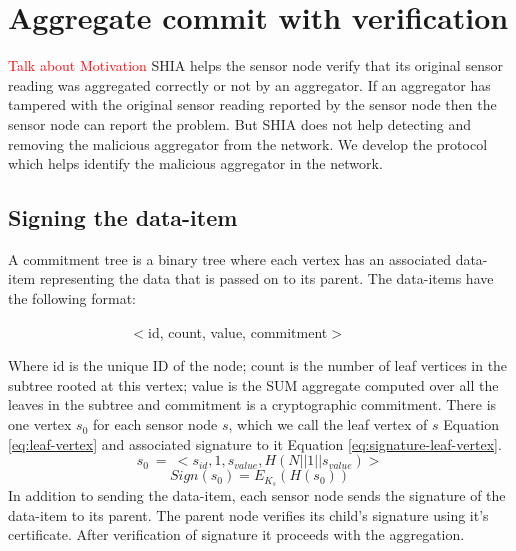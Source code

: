 \chapter{Aggregate commit with verification} %
\label{cha:A Protocol for Commitment Tree Generation}
	
	\textcolor{red}{Talk about Motivation}
	SHIA helps the sensor node verify that its original sensor reading was aggregated correctly or not by an aggregator.
	If an aggregator has tampered with the original sensor reading reported by the sensor node then the sensor node can report the problem.
	But SHIA does not help detecting and removing the malicious aggregator from the network.
	We develop the protocol which helps identify the malicious aggregator in the network.

\section{Signing the data-item}
	\begin{definition}
		\label{def:data-item}
		A commitment tree is a binary tree where each vertex has an associated data-item representing the data that is passed on to its parent. The data-items have the following format:

		$\hspace{100pt}$ $<$id, count, value, commitment$>$
	\end{definition}
	Where id is the unique ID of the node; count is the number of leaf vertices in the subtree rooted at this vertex; value is the SUM aggregate computed over all the leaves in the subtree and commitment is a cryptographic commitment.
	There is one vertex $s_{0}$ for each sensor node $s$, which we call the leaf vertex of $s$ Equation \ref{eq:leaf-vertex} and associated signature to it Equation \ref{eq:signature-leaf-vertex}.
	\begin{equation}
		\label{eq:leaf-vertex}
		s_{0}\ =\ <s_{id}, 1, s_{value}, H(N||1||s_{value})>
	\end{equation}
	\begin{equation}
		\label{eq:signature-leaf-vertex}
		Sign(s_{0}) = E_{K_{s}}(H(s_{0}))
	\end{equation}
	In addition to sending the data-item, each sensor node sends the signature of the data-item to its parent.
	The parent node verifies its child's signature using it's certificate.
	After verification of signature it proceeds with the aggregation.

